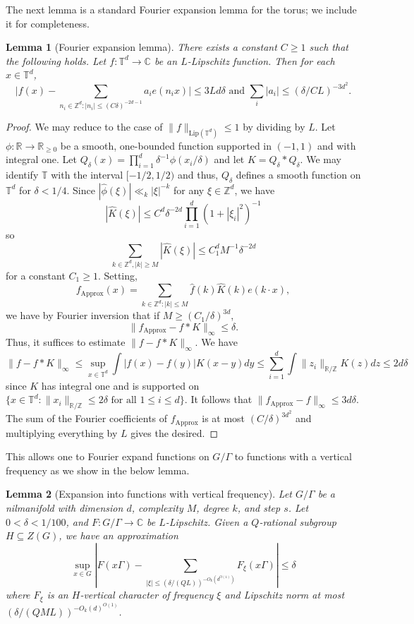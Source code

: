 \documentclass[11pt, a4paper]{amsart}
\theoremstyle{plain}
\theoremstyle{plain}
\newtheorem{lemma}{Lemma}
\theoremstyle{definition}
\theoremstyle{remark}
\numberwithin{equation}{section}
\numberwithin{lemma}{section}
\numberwithin{proposition}{section}
\numberwithin{corollary}{section}
\numberwithin{definition}{section}
\numberwithin{claim}{section}
\begin{document}
The next lemma is a standard Fourier expansion lemma for the torus; we include it for completeness.
\begin{lemma}[Fourier expansion lemma]\label{l:FourierExpansion}
There exists a constant $C \ge 1$ such that the following holds. Let $f\colon \mathbb{T}^d \to \mathbb{C}$ be an $L$-Lipschitz function. Then for each $x \in \mathbb{T}^d$,
$$\Bigg|f(x) - \sum_{n_i\in \mathbb{Z}^d: |n_i| \le (C\delta)^{-2d- 1}} a_i e(n_i x)\Bigg| \le 3Ld\delta \text{ and } \sum_{i} |a_i| \le (\delta/CL)^{-3d^2}.$$
\end{lemma}
\begin{proof}
We may reduce to the case of $\|f\|_{\mathrm{Lip}(\mathbb{T}^d)} \le 1$ by dividing by $L$. Let $\phi\colon \mathbb{R} \to \mathbb{R}_{\ge 0}$ be a smooth, one-bounded function supported in $(-1, 1)$ and with integral one. Let $Q_\delta(x) = \prod_{i = 1}^d \delta^{-1}\phi(x_i/\delta)$ and let $K = Q_\delta * Q_\delta$. We may identify $\mathbb{T}$ with the interval $[-1/2, 1/2)$ and thus, $Q_\delta$ defines a smooth function on $\mathbb{T}^d$ for $\delta < 1/4$. Since $|\hat{\phi}(\xi)| \ll_k |\xi|^{-k}$ for any $\xi \in \mathbb{Z}^d$, we have
$$|\hat{K}(\xi)| \le C^d \delta^{-2d} \prod_{i = 1}^d (1 + |\xi_i|^2)^{-1}$$
so
$$\sum_{k \in \mathbb{Z}^d, |k| \ge M} |\hat{K}(\xi)| \le C_1^dM^{-1}\delta^{-2d}$$
for a constant $C_1 \ge 1$. Setting, 
$$f_{\mathrm{Approx}}(x) = \sum_{k \in \mathbb{Z}^d: |k| \le M} \hat{f}(k) \hat{K}(k) e(k \cdot x),$$
we have by Fourier inversion that if $M \ge (C_1/\delta)^{3d}$,
$$\|f_{\mathrm{Approx}} - f * K\|_\infty \le \delta.$$
Thus, it suffices to estimate $\|f - f * K\|_{\infty}$. We have
$$\|f - f * K\|_\infty \le \sup_{x \in \mathbb{T}^d}\int |f(x) - f(y)|K(x - y) dy \le \sum_{i = 1}^d  \int \|z_i\|_{\mathbb{R}/\mathbb{Z}} K(z) dz \le 2d\delta$$
since $K$ has integral one and is supported on $\{x \in \mathbb{T}^d: \|x_i\|_{\mathbb{R}/\mathbb{Z}} \le 2\delta \text{ for all } 1 \le i \le d\}$. It follows that $\|f_{\mathrm{Approx}} - f\|_\infty \le 3d\delta$. The sum of the Fourier coefficients of $f_{\mathrm{Approx}}$ is at most $(C/\delta)^{3d^2}$ and multiplying everything by $L$ gives the desired.
\end{proof}
This allows one to Fourier expand functions on $G/\Gamma$ to functions with a vertical frequency as we show in the below lemma.
\begin{lemma}[Expansion into functions with vertical frequency]\label{l:nilcharacters}
Let $G/\Gamma$ be a nilmanifold with dimension $d$, complexity $M$, degree $k$, and step $s$. Let $0 < \delta < 1/100$, and $F\colon G/\Gamma \to \mathbb{C}$ be $L$-Lipschitz. Given a $Q$-rational subgroup $H \subseteq Z(G)$, we have an approximation
$$\sup_{x \in G} \left|F(x\Gamma) - \sum_{|\xi| \le (\delta/(QL))^{-O_k(d^{O(1)})}} F_\xi(x\Gamma)\right| \le \delta$$
where $F_\xi$ is an $H$-vertical character of frequency $\xi$ and Lipschitz norm at most $(\delta/(QML))^{-O_k(d)^{O(1)}}$.
\end{lemma}
\end{document}
